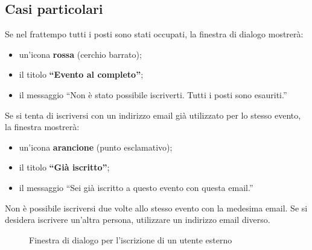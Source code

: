 \documentclass[a4paper,11pt,oneside]{book}
\begin{document}
\subsection{Casi particolari}

\begin{description}[leftmargin=1.5em, style=nextline]
  \item[Evento al completo]
    Se nel frattempo tutti i posti sono stati occupati, la finestra di dialogo mostrer\`a:
    \begin{itemize}
      \item un'icona \textbf{rossa} (cerchio barrato);
      \item il titolo \textbf{``Evento al completo''};
      \item il messaggio ``Non \`e stato possibile iscriverti. Tutti i posti sono esauriti.''
    \end{itemize}

  \item[Gi\`a iscritto]
    Se si tenta di iscriversi con un indirizzo email gi\`a utilizzato per lo stesso evento, la finestra mostrer\`a:
    \begin{itemize}
      \item un'icona \textbf{arancione} (punto esclamativo);
      \item il titolo \textbf{``Gi\`a iscritto''};
      \item il messaggio ``Sei gi\`a iscritto a questo evento con questa email.''
    \end{itemize}
\end{description}

\begin{warningbox}
Non \`e possibile iscriversi due volte allo stesso evento con la medesima email. Se si desidera iscrivere un'altra persona, utilizzare un indirizzo email diverso.
\end{warningbox}

\begin{figure}[htbp]
\centering
{}
\caption{Finestra di dialogo per l'iscrizione di un utente esterno}
\label{fig:external-registration-form}
\end{figure}
\end{document}
